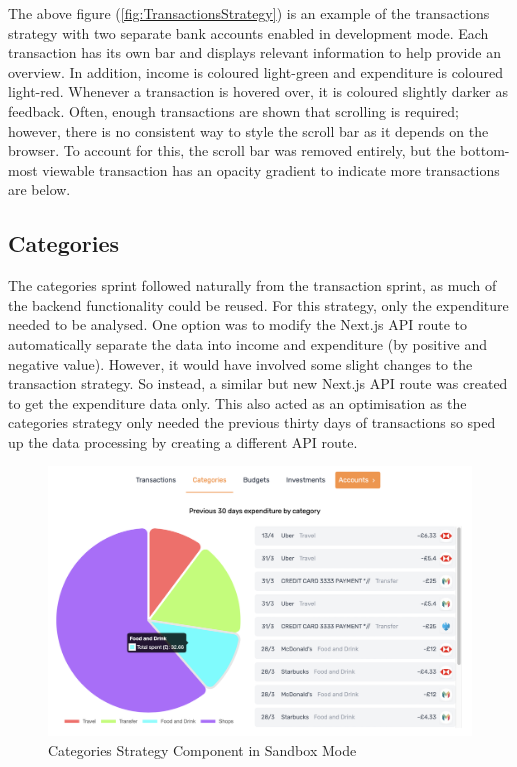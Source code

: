 The above figure (\ref{fig:TransactionsStrategy}) is an example of the transactions strategy with two separate bank accounts enabled in development mode. Each transaction has its own bar and displays relevant information to help provide an overview. In addition, income is coloured light-green and expenditure is coloured light-red. Whenever a transaction is hovered over, it is coloured slightly darker as feedback. Often, enough transactions are shown that scrolling is required; however, there is no consistent way to style the scroll bar as it depends on the browser. To account for this, the scroll bar was removed entirely, but the bottom-most viewable transaction has an opacity gradient to indicate more transactions are below.

\subsection{Categories}
The categories sprint followed naturally from the transaction sprint, as much of the backend functionality could be reused. For this strategy, only the expenditure needed to be analysed. One option was to modify the Next.js API route to automatically separate the data into income and expenditure (by positive and negative value). However, it would have involved some slight changes to the transaction strategy. So instead, a similar but new Next.js API route was created to get the expenditure data only. This also acted as an optimisation as the categories strategy only needed the previous thirty days of transactions so sped up the data processing by creating a different API route.

\begin{figure}[H]
	\centering
	\includegraphics[width=\textwidth]{images/categories_sandbox.png}
	\caption{Categories Strategy Component in Sandbox Mode}
	\label{fig:CategoriesStrategySandbox}
\end{figure}

